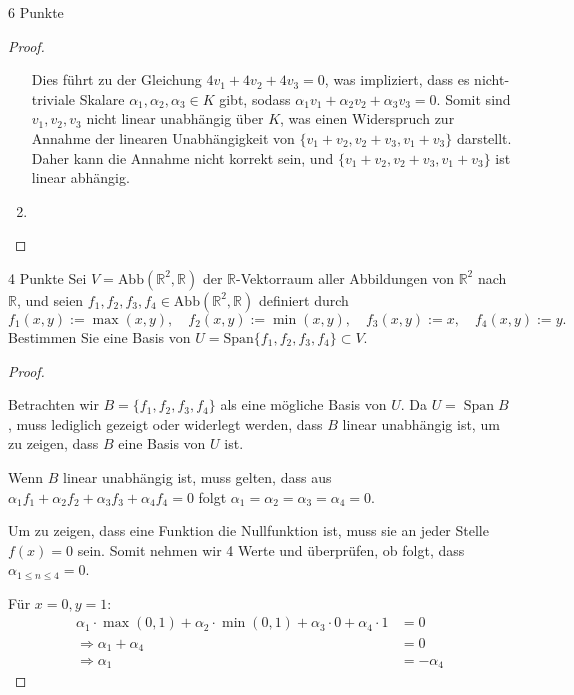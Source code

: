 \documentclass{problemset}
\begin{document}
\begin{problem}{6 Punkte}
\begin{proof}
\begin{enumerate}
		      Dies führt zu der Gleichung $4v_1 + 4v_2 + 4v_3 = 0$, was impliziert, dass es nicht-triviale Skalare $\alpha_1, \alpha_2, \alpha_3 \in K$ gibt, sodass $\alpha_1 v_1 + \alpha_2 v_2 + \alpha_3 v_3 = 0$.
		      Somit sind $v_1, v_2, v_3$ nicht linear unabhängig über $K$, was einen Widerspruch zur Annahme der linearen Unabhängigkeit von $\{v_1+v_2, v_2+v_3, v_1+v_3\}$ darstellt.
		      Daher kann die Annahme nicht korrekt sein, und $\{v_1+v_2, v_2+v_3, v_1+v_3\}$ ist linear abhängig.

		\item
	\end{enumerate}
\end{proof}
\end{problem}

\begin{problem}{4 Punkte}
Sei $V = \text{Abb}(\mathbb{R}^2, \mathbb{R})$ der $\mathbb{R}$-Vektorraum aller Abbildungen von $\mathbb{R}^2$ nach $\mathbb{R}$, und seien $f_1, f_2, f_3, f_4 \in \text{Abb}(\mathbb{R}^2, \mathbb{R})$ definiert durch
\[ f_1(x, y) := \max(x, y), \quad f_2(x, y) := \min(x, y), \quad f_3(x, y) := x, \quad f_4(x, y) := y. \]
Bestimmen Sie eine Basis von $U = \text{Span}\{f_1, f_2, f_3, f_4\} \subset V$.
\begin{proof}
	$ $

	Betrachten wir $B = \{f_1, f_2, f_3, f_4\}$ als eine mögliche Basis von $U$.
	Da $U = \operatorname{Span} B$, muss lediglich gezeigt oder widerlegt werden, dass $B$ linear unabhängig ist, um zu zeigen, dass $B$ eine Basis von $U$ ist.

	Wenn $B$ linear unabhängig ist, muss gelten, dass aus $\alpha_1 f_1 + \alpha_2 f_2 + \alpha_3 f_3 + \alpha_4 f_4 = 0$ folgt $\alpha_1 = \alpha_2 = \alpha_3 = \alpha_4 = 0$.

	Um zu zeigen, dass eine Funktion die Nullfunktion ist, muss sie an jeder Stelle $f(x) = 0$ sein.
	Somit nehmen wir 4 Werte und überprüfen, ob folgt, dass $\alpha_{1 \le n \le 4} = 0$.

	Für $x = 0, y = 1$:
	\begin{align*}
		\alpha_1 \cdot \max(0, 1) + \alpha_2 \cdot \min(0, 1) + \alpha_3 \cdot 0 + \alpha_4 \cdot 1 & = 0         \\
		\Rightarrow \alpha_1 + \alpha_4                                                             & = 0         \\
		\Rightarrow \alpha_1                                                                        & = -\alpha_4
	\end{align*}


\end{proof}
\end{problem}
\end{document}
